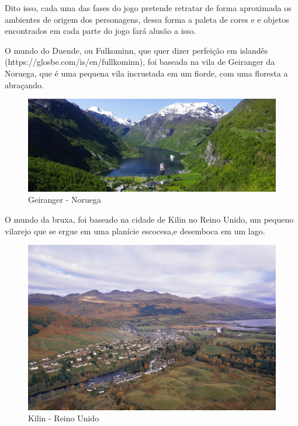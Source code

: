 Dito isso, cada uma das fases do jogo pretende retratar de forma aproximada os ambientes de origem dos personagens, dessa forma a paleta de cores e e objetos encontrados em cada parte do jogo fará alusão a isso.

O mundo do Duende, ou Fulkominn, que quer dizer perfeição em islandês (https://glosbe.com/is/en/fullkominn), foi baseada na vila de Geiranger da Noruega, que é uma pequena vila incrustada em um fiorde, com uma floresta a abraçando.

\begin{figure}[htb]
    \caption{\label{fig_mundoDuende}Geiranger - Noruega}
    \begin{center}
        \includegraphics[width=\textwidth/2]{imagens/geiranger.jpeg}
    \end{center}
\end{figure}


O mundo da bruxa, foi baseado na cidade de Kilin no Reino Unido, um pequeno vilarejo que se ergue em uma planície escocesa,e desemboca em um lago.

\begin{figure}[htb]
    \caption{\label{fig_mundoBruxa}Kilin - Reino Unido}
    \begin{center}
        \includegraphics[width=\textwidth/2]{imagens/kilin.jpg}
    \end{center}
\end{figure}

